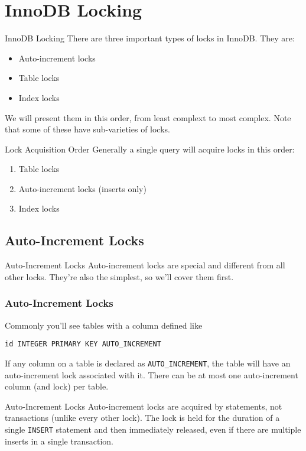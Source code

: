 \documentclass[14pt]{beamer}
\begin{document}
\section{InnoDB Locking}

\begin{frame}{InnoDB Locking}
  There are three important types of locks in InnoDB. They are:
  \begin{itemize}
    \item Auto-increment locks
    \item Table locks
    \item Index locks
  \end{itemize}
  We will present them in this order, from least complext to most complex. Note
  that some of these have sub-varieties of locks.
\end{frame}

\begin{frame}{Lock Acquisition Order}
  Generally a single query will acquire locks in this order:
  \begin{enumerate}
    \item Table locks
    \item Auto-increment locks (inserts only)
    \item Index locks
  \end{enumerate}
\end{frame}

\subsection{Auto-Increment Locks}

\begin{frame}{Auto-Increment Locks}
  Auto-increment locks are special and different from all other locks. They're
  also the simplest, so we'll cover them first.
\end{frame}

\begin{frame}[fragile]
  \frametitle{Auto-Increment Locks}
  Commonly you'll see tables with a column defined like
\begin{verbatim}
id INTEGER PRIMARY KEY AUTO_INCREMENT
\end{verbatim}
  If any column on a table is declared as \texttt{AUTO\_INCREMENT}, the table
  will have an auto-increment lock associated with it. There can be at most one
  auto-increment column (and lock) per table.
\end{frame}

\begin{frame}{Auto-Increment Locks}
  Auto-increment locks are acquired by statements, not transactions (unlike
  every other lock).
  \newline
  \newline
  The lock is held for the duration of a single \texttt{INSERT} statement and
  then immediately released, even if there are multiple inserts in a single
  transaction.
\end{frame}
\end{document}
